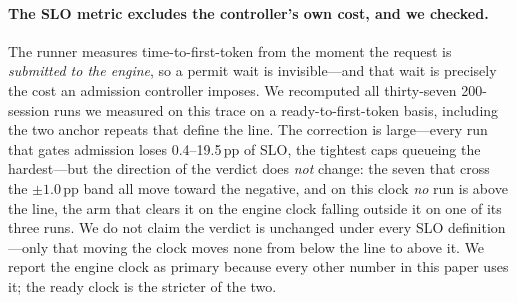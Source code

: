 \paragraph{The SLO metric excludes the controller's own cost, and we checked.}
The runner measures time-to-first-token from the moment the request is
\emph{submitted to the engine}, so a permit wait is invisible---and that wait is
precisely the cost an admission controller imposes. We recomputed all
thirty-seven 200-session runs we measured on this trace on a
ready-to-first-token basis, including the two anchor repeats that define the line. The correction is
large---every run that gates admission loses 0.4--19.5\,pp of SLO, the tightest
caps queueing the hardest---but the direction of the verdict does \emph{not}
change: the seven that cross the $\pm1.0$\,pp band all move toward the negative,
and on this clock \emph{no} run is above the line, the arm that clears
it on the engine clock falling outside it on one of its three runs. We do not claim the verdict
is unchanged under every SLO definition---only that moving the clock moves none
from below the line to above it. We report the engine clock as primary because every other number in
this paper uses it; the ready clock is the stricter of the two.

